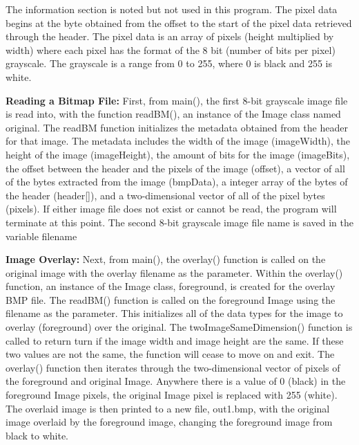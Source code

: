 \documentclass{article}
\begin{document}
\begin{multicols*}{2}
The information section is noted but not used in this program. The pixel data begins at the byte obtained from the offset to the start of the pixel data retrieved through the header. The pixel data is an array of pixels (height multiplied by width) where each pixel has the format of the 8 bit (number of bits per pixel) grayscale. The grayscale is a range from 0 to 255, where 0 is black and 255 is white. 

{\bf Reading a Bitmap File:}
First, from main(), the first 8-bit grayscale image file is read into, with the function readBM(), an instance of the Image class named original. The readBM function initializes the metadata obtained from the header for that image. The metadata includes the width of the image (imageWidth), the height of the image (imageHeight), the amount of bits for the image (imageBits), the offset between the header and the pixels of the image (offset), a vector of all of the bytes extracted from the image (bmpData), a integer array of the bytes of the header (header[]), and a two-dimensional vector of all of the pixel bytes (pixels). If either image file does not exist or cannot be read, the program will terminate at this point. The second 8-bit grayscale image file name is saved in the variable filename

{\bf Image Overlay:}
Next, from main(), the overlay() function is called on the original image with the overlay filename as the parameter. Within the overlay() function, an instance of the Image class, foreground, is created for the overlay BMP file. The readBM() function is called on the foreground Image using the filename as the parameter. This initializes all of the data types for the image to overlay (foreground) over the original. The twoImageSameDimension() function is called to return turn if the image width and image height are the same. If these two values are not the same, the function will cease to move on and exit. The overlay() function then iterates through the two-dimensional vector of pixels of the foreground and original Image. Anywhere there is a value of 0 (black) in the foreground Image pixels, the original Image pixel is replaced with 255 (white). The overlaid image is then printed to a new file, out1.bmp, with the original image overlaid by the foreground image, changing the foreground image from black to white.


\end{multicols*}
\end{document}
